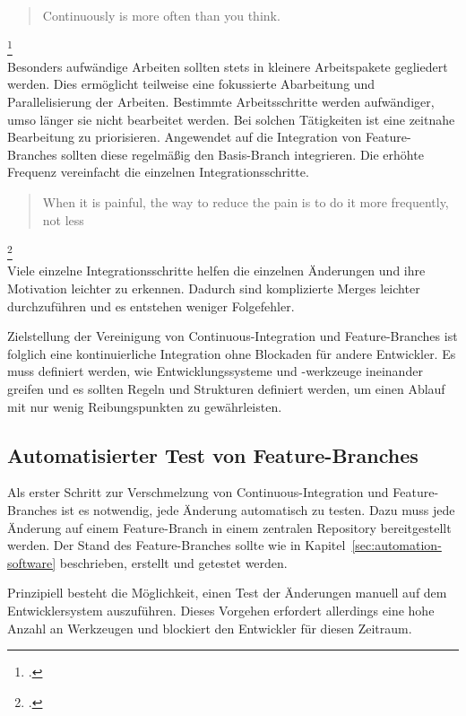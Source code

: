 \blockquote {Continuously is more often than you think.}\footcite[vgl.][Kap. Continuous Integration]{humble2010}\\

Besonders aufwändige Arbeiten sollten stets in kleinere Arbeitspakete gegliedert werden. Dies ermöglicht teilweise eine fokussierte Abarbeitung und Parallelisierung der Arbeiten. Bestimmte Arbeitsschritte werden aufwändiger, umso länger sie nicht bearbeitet werden. Bei solchen Tätigkeiten ist eine zeitnahe Bearbeitung zu priorisieren.
Angewendet auf die Integration von Feature-Branches sollten diese regelmäßig den Basis-Branch integrieren. Die erhöhte Frequenz vereinfacht die einzelnen Integrationsschritte.\\

\blockquote {When it is painful, the way to reduce the pain is to do it more frequently, not less}\footcite[vgl.][S.24]{humble2010}\\

Viele einzelne Integrationsschritte helfen die einzelnen Änderungen und ihre Motivation leichter zu erkennen. Dadurch sind komplizierte Merges leichter durchzuführen und es entstehen weniger Folgefehler.
 
Zielstellung der Vereinigung von Continuous-Integration und Feature-Branches ist folglich eine kontinuierliche Integration ohne Blockaden für andere Entwickler. Es muss definiert werden, wie Entwicklungssysteme und -werkzeuge ineinander greifen und es sollten Regeln und Strukturen definiert werden, um einen Ablauf mit nur wenig Reibungspunkten zu gewährleisten.

\subsection{Automatisierter Test von Feature-Branches}

Als erster Schritt zur Verschmelzung von Continuous-Integration und Feature-Branches ist es notwendig, jede Änderung automatisch zu testen. Dazu muss jede Änderung auf einem Feature-Branch in einem zentralen Repository bereitgestellt werden. Der Stand des Feature-Branches sollte wie in Kapitel~\ref{sec:automation-software}  beschrieben, erstellt und getestet werden.

Prinzipiell besteht die Möglichkeit, einen Test der Änderungen manuell auf dem Entwicklersystem auszuführen. Dieses Vorgehen erfordert allerdings eine hohe Anzahl an Werkzeugen und blockiert den Entwickler für diesen Zeitraum.

